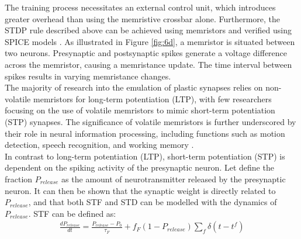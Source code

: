

\noindent The training process necessitates an external control unit, which introduces greater overhead than using the memristive crossbar alone. Furthermore, the STDP rule described above can be achieved using memristors \cite{maranhao2021low} and verified using SPICE models \cite{yakopcic2013generalized}. As illustrated in Figure \ref{fig:6d}, a memristor is situated between two neurons. Presynaptic and postsynaptic spikes generate a voltage difference across the memristor, causing a memristance update. The time interval between spikes results in varying memristance changes.\\

\noindent The majority of research into the emulation of plastic synapses relies on non-volatile memristors for long-term potentiation (LTP), with few researchers focusing on the use of volatile memristors to mimic short-term potentiation (STP) synapses. The significance of volatile memristors is further underscored by their role in neural information processing, including functions such as motion detection, speech recognition, and working memory \cite{ghanbari2017estimating}. \\

\noindent In contrast to long-term potentiation (LTP), short-term potentiation (STP) is dependent on the spiking activity of the presynaptic neuron. Let define the fraction $P_{release}$ as the amount of neurotransmitter released by the presynaptic neuron. It can then be shown that the synaptic weight is directly related to $P_{release}$, and that both STF and STD can be modelled with the dynamics of $P_{release}$. STF can be defined as:
\begin{align}
\frac{dP_{release}}{dt} = \frac{P_{release} - P_0}{\tau_F} + f_F(1 - P_{release})\sum_{f}\delta\left( t- t^f \right) \label{eq:6.13}
\end{align}


